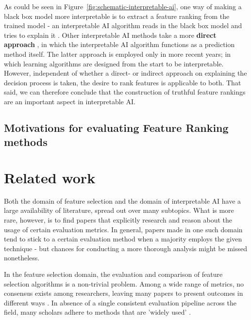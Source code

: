\documentclass{article}
\begin{document}
As could be seen in Figure~\ref{fig:schematic-interpretable-ai}, one way of making a black box model more interpretable is to extract a feature ranking from the trained model - an interpretable AI algorithm reads in the black box model and tries to explain it \citep{lundberg_unified_2017}. Other interpretable AI methods take a more \textbf{direct approach} \citep{arik_tabnet_2020}, in which the interpretable AI algorithm functions as a prediction method itself. The latter approach is employed only in more recent years; in which learning algorithms are designed from the start to be interpretable. However, independent of whether a direct- or indirect approach on explaining the decision process is taken, the desire to rank features is applicable to both. That said, we can therefore conclude that the construction of truthful feature rankings are an important aspect in interpretable AI.

\subsection{Motivations for evaluating Feature Ranking methods}

\section{Related work}\label{section:related work}
Both the domain of feature selection and the domain of interpretable AI have a large availability of literature, spread out over many subtopics. What is more rare, however, is to find papers that explicitly research and reason about the usage of certain evaluation metrics. In general, papers made in one such domain tend to stick to a certain evaluation method when a majority employs the given technique - but chances for conducting a more thorough analysis might be missed nonetheless.

In the feature selection domain, the evaluation and comparison of feature selection algorithms is a non-trivial problem. Among a wide range of metrics, no consensus exists among researchers, leaving many papers to present outcomes in different ways \citep{guyon_introduction_2003}. In absence of a single consistent evaluation pipeline across the field, many scholars adhere to methods that are 'widely used' \citep{solorio-fernandez_review_2020} \citep{li_feature_2017}.
\end{document}
